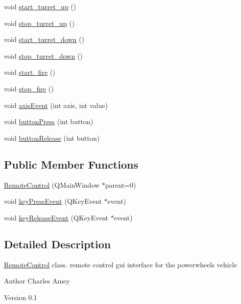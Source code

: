 \begin{DoxyCompactItemize}
\item 
void \hyperlink{classRemoteControl_a1a1aa0c3db04fe4abaac62ce9daf81df}{start\_\-turret\_\-up} ()
\item 
void \hyperlink{classRemoteControl_a79edbfa1fa9b764ed15d659c7589b4bb}{stop\_\-turret\_\-up} ()
\item 
void \hyperlink{classRemoteControl_a1c4e8e2e9ba3082a81b005f6465e5709}{start\_\-turret\_\-down} ()
\item 
void \hyperlink{classRemoteControl_a036332c3c4e0050dda3b0d10db16e110}{stop\_\-turret\_\-down} ()
\item 
void \hyperlink{classRemoteControl_a26e5966e5fdc99f34e3863fd61547d5b}{start\_\-fire} ()
\item 
void \hyperlink{classRemoteControl_ac5410c44cd89eea69a7cbc942dcf07f1}{stop\_\-fire} ()
\item 
void \hyperlink{classRemoteControl_a8091590758f3eac40cf8f15e2adc0d01}{axisEvent} (int axis, int value)
\item 
void \hyperlink{classRemoteControl_aa1c43e477e1ae77b539913fa42ccc7a0}{buttonPress} (int button)
\item 
void \hyperlink{classRemoteControl_ad1f1fc95aa2f537960524196f2b32b88}{buttonRelease} (int button)
\end{DoxyCompactItemize}
\subsection*{Public Member Functions}
\begin{DoxyCompactItemize}
\item 
\hyperlink{classRemoteControl_a882e354d8b4d5b525f2c89e0306fa0ce}{RemoteControl} (QMainWindow $\ast$parent=0)
\item 
void \hyperlink{classRemoteControl_af6ce8ad2fcc3e190df87ede1db78e7ec}{keyPressEvent} (QKeyEvent $\ast$event)
\item 
void \hyperlink{classRemoteControl_a5aa7e982832af00b831401c0dc82fd25}{keyReleaseEvent} (QKeyEvent $\ast$event)
\end{DoxyCompactItemize}


\subsection{Detailed Description}
\hyperlink{classRemoteControl}{RemoteControl} class. remote control gui interface for the powerwheels vehicle \begin{DoxyAuthor}{Author}
Charles Amey 
\end{DoxyAuthor}
\begin{DoxyVersion}{Version}
0.1 
\end{DoxyVersion}


